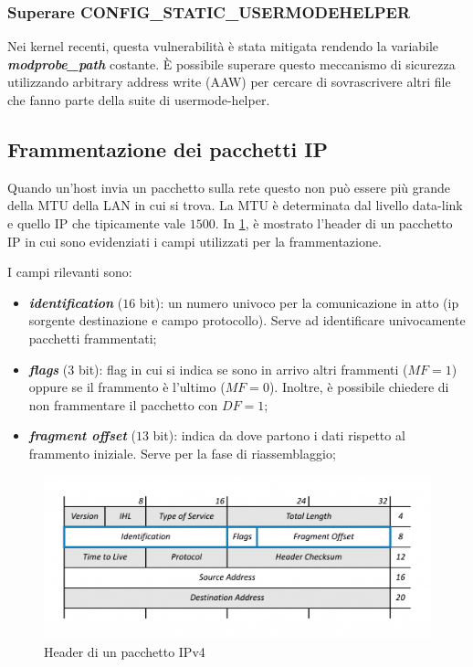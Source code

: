 \documentclass{article}
\begin{document}
\subsubsection{Superare CONFIG\_STATIC\_USERMODEHELPER}
Nei kernel recenti, questa vulnerabilità è stata mitigata rendendo la variabile \textbf{\textit{modprobe\_path}} 
costante. È possibile superare questo meccanismo di sicurezza utilizzando arbitrary address write 
(AAW) per cercare di sovrascrivere altri file che fanno parte della suite di usermode-helper. 

\subsection{Frammentazione dei pacchetti IP}
Quando un'host invia un pacchetto sulla rete questo non può essere più grande della MTU 
della LAN in cui si trova. La MTU è determinata dal livello data-link e quello IP che 
tipicamente vale $1500$. In \cref{fig:ipv4-header}, è mostrato l'header di un pacchetto IP in cui sono 
evidenziati i campi utilizzati per la frammentazione. 

I campi rilevanti sono:
\begin{itemize}
  \item \textbf{\textit{identification}} ($16$ bit): un numero univoco per la comunicazione in atto (ip sorgente 
    destinazione e campo protocollo). Serve ad identificare univocamente pacchetti frammentati;
  \item \textbf{\textit{flags}} ($3$ bit): flag in cui si indica se sono in arrivo altri frammenti ($MF=1$) oppure 
    se il frammento è l'ultimo ($MF=0$). Inoltre, è possibile chiedere di non frammentare il 
    pacchetto con $DF=1$;
  \item \textbf{\textit{fragment offset}} ($13$ bit): indica da dove partono i dati rispetto 
    al frammento iniziale. Serve per la fase di riassemblaggio;
\end{itemize}

\begin{figure}[h]
  \begin{center}
    \includegraphics[width=.75\textwidth]{figures/ch1/IPv4-Headers-Standard-Fragmentation-Highlighted-1024x431.png}
  \end{center}
  \caption{Header di un pacchetto IPv4}\label{fig:ipv4-header}
\end{figure}
\end{document}
